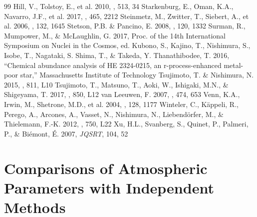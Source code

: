 \documentclass[preprint]{aastex61}
\begin{document}
{\begin{thebibliography}{99}
  Hill, V., Tolstoy, E., et al. 2010, \aap, 513, 34 
 Starkenburg, E.,
  Oman, K.A., Navarro, J.F., et al. 2017, \mnras, 465, 2212
 Steinmetz, M., Zwitter, T.,
  Siebert, A., et al. 2006, \aj, 132, 1645
 Stetson, P.B. \&
Pancino, E. 2008, \pasp, 120, 1332
 Surman, R., Mumpower, M.,
  \& McLaughlin, G. 2017, Proc. of the 14th International Symposium on
  Nuclei in the Cosmos, ed. Kubono, S., Kajino, T., Nishimura, S.,
  Isobe, T., Nagataki, S. Shima, T., \& Takeda, Y.
 Thanathibodee,
  T. 2016, ``Chemical abundance analysis of HE 2324-0215, an
  r-process-enhanced metal-poor star,'' Massachusetts Institute of
  Technology
  Tsujimoto, T. \& Nishimura, N. 2015, \apjl, 811, L10
 Tsujimoto, T.,
  Matsuno, T., Aoki, W., Ishigaki, M.N., \& Shigeyama, T. 2017, \apjl,
  850, L12
 van Leeuwen, F. 2007, \aap, 474, 653
 Venn, K.A., Irwin, M.,
Shetrone, M.D., et al. 2004, \aj, 128, 1177
 Winteler, C.,
  K\"{a}ppeli, R., Perego, A., Arcones, A., Vasset, N., Nishimura, N.,
  Liebend\"{o}rfer, M., \& Thielemann, F.-K. 2012, \apjl, 750, L22
 Xu, H.L., Svanberg, S., Quinet, P., Palmeri, P., \& Bi\'{e}mont, \'{E}. 2007, {\it JQSRT}, 104, 52
\end{thebibliography}
}

\clearpage
\normalsize


\appendix

\section{Comparisons of Atmospheric Parameters with Independent Methods}\label{appendix:Comp}
\end{document}
